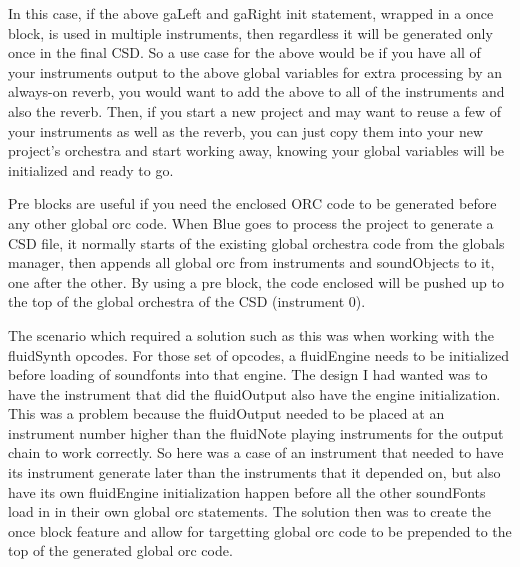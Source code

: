 In this case, if the above gaLeft and gaRight init statement, wrapped in
a once block, is used in multiple instruments, then regardless it will
be generated only once in the final CSD. So a use case for the above
would be if you have all of your instruments output to the above global
variables for extra processing by an always-on reverb, you would want to
add the above to all of the instruments and also the reverb. Then, if
you start a new project and may want to reuse a few of your instruments
as well as the reverb, you can just copy them into your new project's
orchestra and start working away, knowing your global variables will be
initialized and ready to go.

Pre blocks are useful if you need the enclosed ORC code to be generated
before any other global orc code. When Blue goes to process the project
to generate a CSD file, it normally starts of the existing global
orchestra code from the globals manager, then appends all global orc
from instruments and soundObjects to it, one after the other. By using a
pre block, the code enclosed will be pushed up to the top of the global
orchestra of the CSD (instrument 0).

The scenario which required a solution such as this was when working
with the fluidSynth opcodes. For those set of opcodes, a fluidEngine
needs to be initialized before loading of soundfonts into that engine.
The design I had wanted was to have the instrument that did the
fluidOutput also have the engine initialization. This was a problem
because the fluidOutput needed to be placed at an instrument number
higher than the fluidNote playing instruments for the output chain to
work correctly. So here was a case of an instrument that needed to have
its instrument generate later than the instruments that it depended on,
but also have its own fluidEngine initialization happen before all the
other soundFonts load in in their own global orc statements. The
solution then was to create the once block feature and allow for
targetting global orc code to be prepended to the top of the generated
global orc code.
